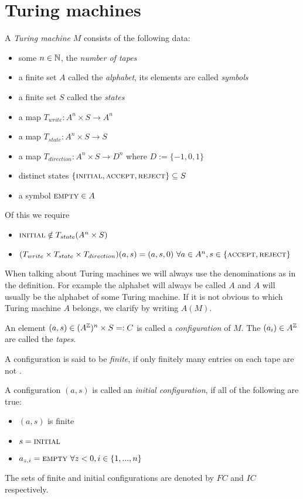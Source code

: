 \section{Turing machines}

\begin{Definition}
	A \emph{Turing machine} $M$ consists of the following data:
	\begin{itemize}
		\item{some $n \in \mathbb{N}$}, the \emph{number of tapes}
		\item{a finite set $A$ called the \emph{alphabet}, its elements are called \emph{symbols}}
		\item{a finite set $S$ called the \emph{states}}
		\item{a map $T_{write}: A^n \times S \to A^n$}
		\item{a map $T_{state}: A^n \times S \to S$}
		\item{a map $T_{direction}: A^n \times S \to D^n$ where $D := \{-1,0,1\}$}
		\item{distinct states $\{\text{\scshape{initial}},\text{\scshape{accept}},\text{\scshape{reject}}\} \subseteq S$}
		\item{a symbol $\text{\scshape{empty}} \in A$}
	\end{itemize}
	Of this we require
	\begin{itemize}
		\item{$\text{\scshape{initial}} \notin T_{state}(A^n \times S)$}
		\item{$(T_{write} \times T_{state} \times T_{direction}) (a,s) = (a,s,0)~\forall a \in A^n , s \in \{\text{\scshape{accept}},\text{\scshape{reject}}\}$}
	\end{itemize}
\end{Definition}
When talking about Turing machines we will always use the denominations as in the definition.
For example the alphabet will always be called $A$ and $A$ will usually be the alphabet of some Turing machine.
If it is not obvious to which Turing machine $A$ belongs, we clarify by writing $A(M)$.

An element $(a,s) \in (A^{\mathbb{Z}})^n \times S =: C$ is called a \emph{configuration} of $M$. The $(a_i) \in A^{\mathbb{Z}}$ are called the \emph{tapes}.

A configuration is said to be \emph{finite}, if only finitely many entries on each tape are not \EMP.

A configuration $(a,s)$ is called an \emph{initial configuration}, if all of the following are true:
\begin{itemize}
	\item{$(a,s)$ is finite}
	\item{$s = \text{\scshape{initial}}$}
	\item{$a_{z,i} = \text{\scshape{empty}}~\forall z < 0, i \in \{1,...,n\}$}
\end{itemize}
The sets of finite and initial configurations are denoted by $FC$ and $IC$ respectively.

